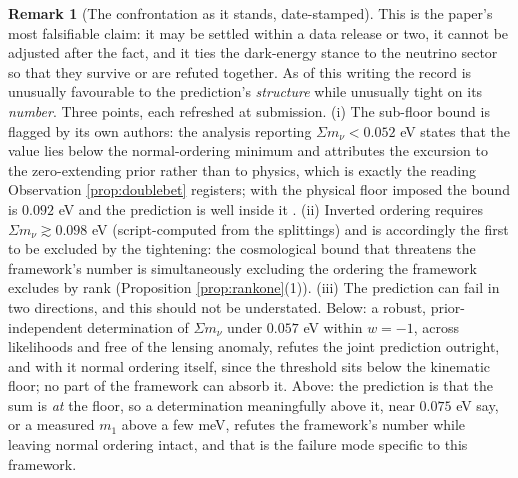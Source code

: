\documentclass[11pt]{article}
\theoremstyle{definition}
\newtheorem{remark}[theorem]{Remark}
\newcommand{\mnu}{\Sigma m_{\nu}}
\begin{document}
\begin{remark}[The confrontation as it stands, date-stamped]\label{rem:currency}
This is the paper's most falsifiable claim: it may be settled within a data release or two, it cannot be adjusted after the fact, and it ties the dark-energy stance to the neutrino sector so that they survive or are refuted together. As of this writing the record is unusually favourable to the prediction's \emph{structure} while unusually tight on its \emph{number}. Three points, each refreshed at submission. (i) The sub-floor bound is flagged by its own authors: the analysis reporting $\mnu < 0.052$ eV states that the value lies below the normal-ordering minimum and attributes the excursion to the zero-extending prior rather than to physics, which is exactly the reading Observation \ref{prop:doublebet} registers; with the physical floor imposed the bound is $0.092$ eV and the prediction is well inside it \cite{HouWangZhaoZhang2026}. (ii) Inverted ordering requires $\mnu \gtrsim 0.098$ eV (script-computed from the splittings) and is accordingly the first to be excluded by the tightening: the cosmological bound that threatens the framework's number is simultaneously excluding the ordering the framework excludes by rank (Proposition \ref{prop:rankone}(1)). (iii) The prediction can fail in two directions, and this should not be understated. Below: a robust, prior-independent determination of $\mnu$ under $0.057$ eV within $w = -1$, across likelihoods and free of the lensing anomaly, refutes the joint prediction outright, and with it normal ordering itself, since the threshold sits below the kinematic floor; no part of the framework can absorb it. Above: the prediction is that the sum is \emph{at} the floor, so a determination meaningfully above it, near $0.075$ eV say, or a measured $m_{1}$ above a few meV, refutes the framework's number while leaving normal ordering intact, and that is the failure mode specific to this framework.
\end{remark}
\end{document}
